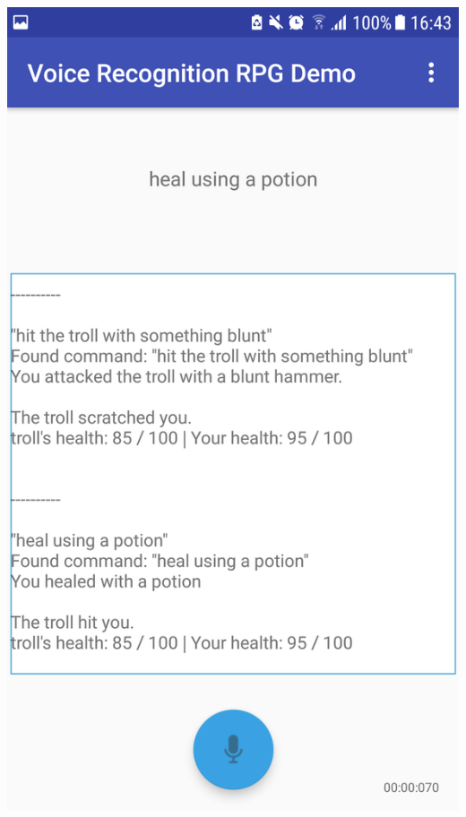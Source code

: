 \documentclass[11pt]{article}
\begin{document}
\begin{appendices}
\begin{center}
\includegraphics[scale=0.18]{battle-3.png}

\end{center}
\end{appendices}
\end{document}
